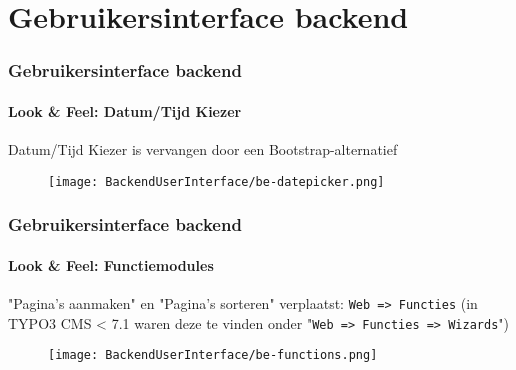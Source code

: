 %

\section{Gebruikersinterface backend}


\begin{frame}[fragile]
	\frametitle{Gebruikersinterface backend}
	\framesubtitle{Look \& Feel: Datum/Tijd Kiezer}

	Datum/Tijd Kiezer is vervangen door een Bootstrap-alternatief
	\begin{figure}
		\texttt{[image: BackendUserInterface/be-datepicker.png]}
	\end{figure}

\end{frame}


\begin{frame}[fragile]
	\frametitle{Gebruikersinterface backend}
	\framesubtitle{Look \& Feel: Functiemodules}

	"Pagina's aanmaken" en "Pagina's sorteren" verplaatst: \texttt{Web => Functies}\newline
	\smaller (in TYPO3 CMS < 7.1 waren deze te vinden onder "\texttt{Web => Functies => Wizards}")

	\begin{figure}
		\texttt{[image: BackendUserInterface/be-functions.png]}
	\end{figure}


\end{frame}

